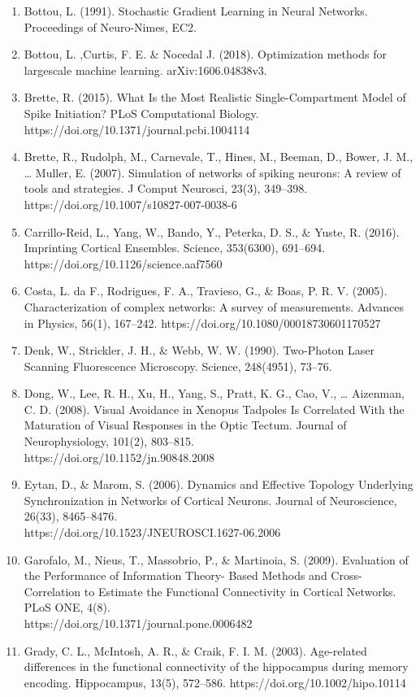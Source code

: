 \documentclass[11pt,titlepage]{article}
\begin{document}
\begin{spacing}{1}
\begin{enumerate}
\item Bottou, L. (1991). Stochastic Gradient Learning in Neural Networks. Proceedings of Neuro-Nimes, EC2.
\item Bottou, L. ,Curtis, F. E. \& Nocedal J. (2018). Optimization methods for largescale
machine learning. arXiv:1606.04838v3.
\item Brette, R. (2015). What Is the Most Realistic Single-Compartment Model of Spike Initiation? PLoS Computational Biology. https://doi.org/10.1371/journal.pcbi.1004114
\item Brette, R., Rudolph, M., Carnevale, T., Hines, M., Beeman, D., Bower, J. M., … Muller, E. (2007). Simulation of networks of spiking neurons: A review of tools and strategies. J Comput Neurosci, 23(3), 349–398. https://doi.org/10.1007/s10827-007-0038-6
\item Carrillo-Reid, L., Yang, W., Bando, Y., Peterka, D. S., \& Yuste, R. (2016). Imprinting Cortical Ensembles. Science, 353(6300), 691–694. https://doi.org/10.1126/science.aaf7560
\item Costa, L. da F., Rodrigues, F. A., Travieso, G., \& Boas, P. R. V. (2005). Characterization of complex networks: A survey of measurements. Advances in Physics, 56(1), 167–242. https://doi.org/10.1080/00018730601170527
\item Denk, W., Strickler, J. H., \& Webb, W. W. (1990). Two-Photon Laser Scanning Fluorescence Microscopy. Science, 248(4951), 73–76.
\item Dong, W., Lee, R. H., Xu, H., Yang, S., Pratt, K. G., Cao, V., … Aizenman, C. D. (2008). Visual Avoidance in Xenopus Tadpoles Is Correlated With the Maturation of Visual Responses in the Optic Tectum. Journal of Neurophysiology, 101(2), 803–815.\\https://doi.org/10.1152/jn.90848.2008
\item Eytan, D., \& Marom, S. (2006). Dynamics and Effective Topology Underlying Synchronization in Networks of Cortical Neurons. Journal of Neuroscience, 26(33), 8465–8476. \\https://doi.org/10.1523/JNEUROSCI.1627-06.2006
\item Garofalo, M., Nieus, T., Massobrio, P., \& Martinoia, S. (2009). Evaluation of the Performance of Information Theory- Based Methods and Cross-Correlation to Estimate the Functional Connectivity in Cortical Networks. PLoS ONE, 4(8).\\https://doi.org/10.1371/journal.pone.0006482
\item Grady, C. L., McIntosh, A. R., \& Craik, F. I. M. (2003). Age-related differences in the functional connectivity of the hippocampus during memory encoding. Hippocampus, 13(5), 572–586. https://doi.org/10.1002/hipo.10114

\end{enumerate}
\end{spacing}
\end{document}

